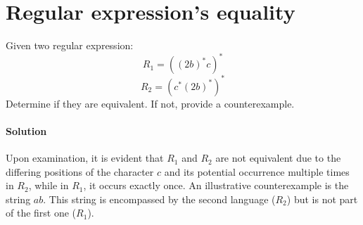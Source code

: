 \section{Regular expression's equality}

Given two regular expression: 
\[R_1=((2b)^{*}c)^*\]
\[R_2=(c^*(2b)^{*})^*\]
Determine if they are equivalent. 
If not, provide a counterexample.

\paragraph*{Solution}
Upon examination, it is evident that $R_1$ and $R_2$ are not equivalent due to the differing positions of the character $c$ and its potential occurrence multiple times in $R_2$, while in $R_1$, it occurs exactly once. 
An illustrative counterexample is the string $ab$. 
This string is encompassed by the second language ($R_2$) but is not part of the first one ($R_1$).